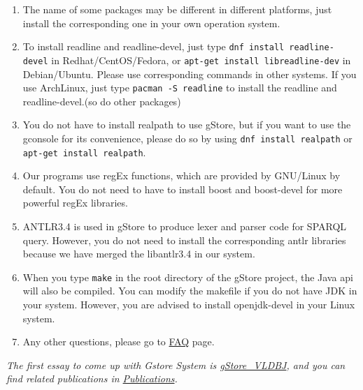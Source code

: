 \documentclass[titlepage, a4paper, 12pt]{article}
\begin{document}
\begin{enumerate}
\item
  The name of some packages may be different in different platforms, just install the corresponding one in your own operation system.
\item
  To install readline and readline-devel, just type \texttt{dnf\ install\ readline-devel} in Redhat/CentOS/Fedora, or \texttt{apt-get\ install\ libreadline-dev} in Debian/Ubuntu. Please use corresponding commands in other systems. If you use ArchLinux, just type \texttt{pacman\ -S\ readline} to install the readline and readline-devel.(so do other packages)
\item
  You do not have to install realpath to use gStore, but if you want to use the gconsole for its convenience, please do so by using \texttt{dnf\ install\ realpath} or \texttt{apt-get\ install\ realpath}.
\item
  Our programs use regEx functions, which are provided by GNU/Linux by default. You do not need to have to install boost and boost-devel for more powerful regEx libraries.
\item
  ANTLR3.4 is used in gStore to produce lexer and parser code for SPARQL query. However, you do not need to install the corresponding antlr libraries because we have merged the libantlr3.4 in our system.
\item
  When you type \texttt{make} in the root directory of the gStore project, the Java api will also be compiled. You can modify the makefile if you do not have JDK in your system. However, you are advised to install openjdk-devel in your Linux system.
\item
  Any other questions, please go to \hyperref[chapter10]{FAQ} page.
\end{enumerate}

\clearpage


\textit{The first essay to come up with Gstore System is
\href{run:../pdf/gStoreVLDBJ.pdf}{gStore\_VLDBJ}, and you can find related publications in
\hyperref[chapter08]{Publications}.}

\end{document}
